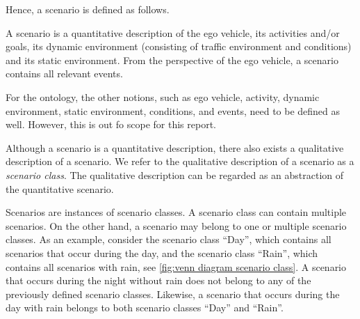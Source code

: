 Hence, a scenario is defined as follows.
\begin{definition}[Scenario]\label{def:scenario}
	A scenario is a quantitative description of the ego vehicle, its activities and/or goals, its dynamic environment (consisting of traffic environment and conditions) and its static environment. From the perspective of the ego vehicle, a scenario contains all relevant events.
\end{definition}

For the ontology, the other notions, such as ego vehicle, activity, dynamic environment, static environment, conditions, and events, need to be defined as well. However, this is out fo scope for this report.

Although a scenario is a quantitative description, there also exists a qualitative description of a scenario. We refer to the qualitative description of a scenario as a \emph{scenario class}. The qualitative description can be regarded as an abstraction of the quantitative scenario.

Scenarios are instances of scenario classes. A scenario class can contain multiple scenarios. On the other hand, a scenario may belong to one or multiple scenario classes. As an example, consider the scenario class ``Day'', which contains all scenarios that occur during the day, and the scenario class ``Rain'', which contains all scenarios with rain, see \cref{fig:venn diagram scenario class}. A scenario that occurs during the night without rain does not belong to any of the previously defined scenario classes. Likewise, a scenario that occurs during the day with rain belongs to both scenario classes ``Day'' and ``Rain''. 

